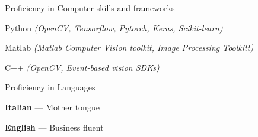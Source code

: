 


\begin{cventries}

 
  \cventry
    {Proficiency in} %
    {Computer skills and frameworks} %
    {} %
    {} %
    {
      \begin{cvitems} %
	\item Python \textit{(OpenCV, Tensorflow, Pytorch, Keras, Scikit-learn)}
	\item Matlab \textit{(Matlab Computer Vision toolkit, Image Processing Toolkitt)}
	\item C++ \textit{(OpenCV, Event-based vision SDKs)}
	\end{cvitems}
	}
	
  \cventry
    {Proficiency in} %
    {Languages} %
    {} %
    {} %
    {
      \begin{cvitems} %
	\item \textbf{Italian} --- {Mother tongue}
	\item \textbf{English} --- {Business fluent}
	\end{cvitems}
	}
	
	

\end{cventries}
